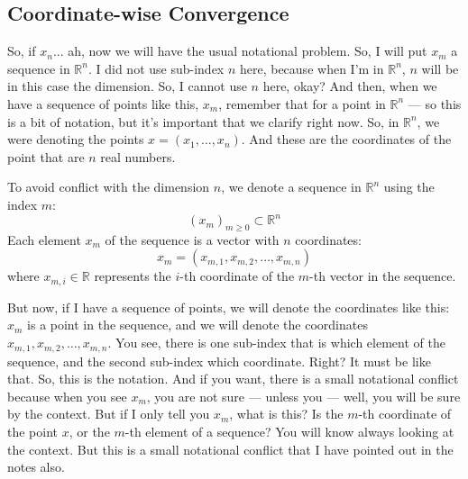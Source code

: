 
\subsection*{Coordinate-wise Convergence}

\begin{spoken-clean}[00:12:38 - 00:14:12]
So, if $x_n$... ah, now we will have the usual notational problem. So, I will put $x_m$  a sequence in $\mathbb{R}^n$. I did not use sub-index $n$ here, because when I'm in $\mathbb{R}^n$, $n$ will be in this case the dimension. So, I cannot use $n$ here, okay? And then, when we have a sequence of points like this, $x_m$, remember that for a point in $\mathbb{R}^n$ --- so this is a bit of notation, but it's important that we clarify right now. So, in $\mathbb{R}^n$, we were denoting the points $x = (x_1, \dots, x_n)$. And these are the coordinates of the point that are $n$ real numbers.
\end{spoken-clean}

\begin{math-stroke}
To avoid conflict with the dimension $n$, we denote a sequence in $\mathbb{R}^n$ using the index $m$:
\[ (x_m)_{m \ge 0} \subset \mathbb{R}^n \]
Each element $x_m$ of the sequence is a vector with $n$ coordinates:
\[ x_m = (x_{m,1}, x_{m,2}, \dots, x_{m,n}) \]
where $x_{m,i} \in \mathbb{R}$ represents the $i$-th coordinate of the $m$-th vector in the sequence.
\end{math-stroke}

\begin{spoken-clean}[00:14:12 - 00:15:50]
But now, if I have a sequence of points, we will denote the coordinates like this: $x_m$ is a point in the sequence, and we will denote the coordinates $x_{m,1}, x_{m,2}, \dots, x_{m,n}$.  You see, there is one sub-index that is which element of the sequence, and the second sub-index which coordinate. Right? It must be like that. So, this is the notation. And if you want, there is a small notational conflict because when you see $x_m$, you are not sure --- unless you --- well, you will be sure by the context. But if I only tell you $x_m$, what is this? Is the $m$-th coordinate of the point $x$, or the $m$-th element of a sequence? You will know always looking at the context. But this is a small notational conflict that I have pointed out in the notes also.
\end{spoken-clean}

